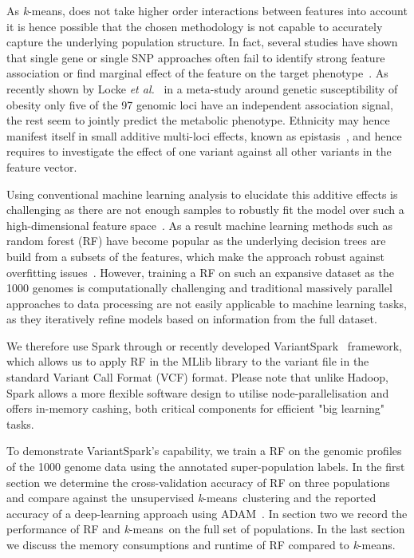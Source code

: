 \documentclass{llncs}
\newcommand{\variantSpark}{{\sc VariantSpark}}
\newcommand{\kMeans}{\textit{k}-means}
\begin{document}
{As \kMeans, does not take higher order interactions between features into account it is hence possible that the chosen methodology is not capable to accurately capture the underlying population structure. 
In fact, several studies have shown that single gene or single SNP approaches often fail to identify strong feature association or find marginal effect of the feature on the target phenotype~\cite{Bureau2005,Yoo2012,Qi2012}. 
As recently shown by Locke {\it et al.}~\cite{Locke2015} in a meta-study around genetic susceptibility of obesity only five of the 97 genomic loci have an independent association signal, the rest seem to jointly predict the metabolic phenotype.
Ethnicity may hence manifest itself in small additive multi-loci effects, known as epistasis~\cite{Mackay2014}, and hence requires to investigate the effect of one variant against all other variants in the feature vector.

Using conventional machine learning analysis to elucidate this additive effects is challenging as there are not enough samples to robustly fit the model over such a high-dimensional feature space~\cite{Chen2012}. 
As a result machine learning methods such as random forest (RF) have become popular as the underlying decision trees are build from a subsets of the features, which make the approach robust against overfitting issues~\cite{Breiman2001}. 
However, training a RF on such an expansive dataset as the 1000 genomes is computationally challenging and traditional massively parallel approaches to data processing are not easily applicable to machine learning tasks, as they iteratively refine models based on information from the full dataset. 

We therefore use {\sc Spark} through or recently developed \variantSpark~\cite{OBrien} framework, which allows us to apply RF in the MLlib library to the variant file in the standard Variant Call Format (VCF) format. 
Please note that unlike {\sc Hadoop}, {\sc Spark} allows a more flexible software design to utilise node-parallelisation and offers in-memory cashing, both critical components for efficient "big learning" tasks. 

To demonstrate \variantSpark's capability, we train a RF on the genomic profiles of the 1000 genome data using the annotated super-population labels. 
In the first section we determine the cross-validation accuracy of RF on three populations and compare against the unsupervised \kMeans\ clustering and the reported accuracy of a deep-learning approach using {\sc ADAM}~\cite{Massie2013}.
In section two we record the performance of RF and \kMeans\ on the full set of populations. 
In the last section we discuss the memory consumptions and runtime of RF compared to \kMeans.


}
\end{document}
